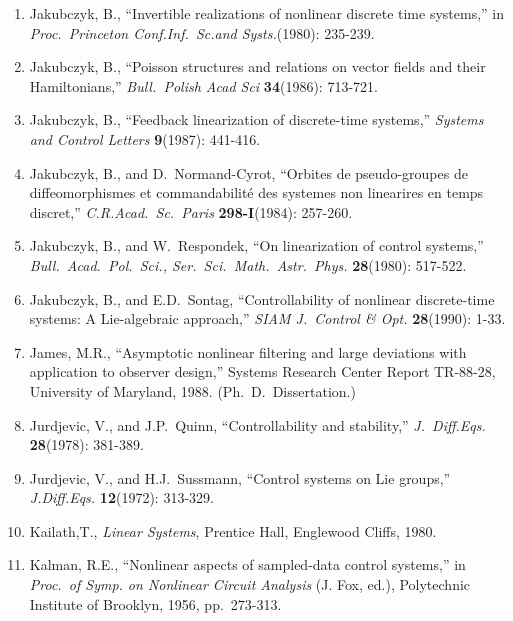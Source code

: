 \begin{enumerate}
\item
Jakubczyk, B., ``Invertible realizations of nonlinear discrete time systems,''
in {\it Proc.\ Princeton Conf.Inf.\ Sc.and Systs.}(1980): 235-239.

\item
Jakubczyk, B., ``Poisson structures and relations on vector fields and their
Hamiltonians,'' {\it Bull.\ Polish Acad Sci} {\bf 34}(1986): 713-721.

\item
Jakubczyk, B., ``Feedback linearization of discrete-time systems,'' {\it
Systems and Control Letters} {\bf 9}(1987): 441-416.

\item
Jakubczyk, B., and D.\ Normand-Cyrot, ``Orbites de pseudo-groupes de
diffeomorphismes et commandabilit\'e des systemes non linearires en temps
discret,'' {\it C.R.Acad.\ Sc.\ Paris} {\bf 298-I}(1984): 257-260.

\item
Jakubczyk, B., and W.\ Respondek, ``On linearization of control systems,''
{\it Bull.\ Acad.~Pol.~Sci., Ser.\ Sci.\ Math.\ Astr.\ Phys.} {\bf 28}(1980):
517-522.

\item
Jakubczyk, B., and E.D.\ Sontag, ``Controllability of nonlinear
dis\-crete-time systems: A Lie-algebraic approach,'' {\it SIAM J.\ Control \&
Opt.} {\bf 28}(1990): 1-33.

\item
James, M.R., ``Asymptotic nonlinear filtering and large deviations with
application to observer design,'' Systems Research Center Report TR-88-28,
University of Maryland, 1988.  (Ph.\ D.\ Dissertation.)

\item
Jurdjevic, V., and J.P.\ Quinn, ``Controllability and stability,'' {\it J.\
Diff.Eqs.} {\bf 28}(1978): 381-389.

\item
Jurdjevic, V., and H.J.\ Sussmann, ``Control systems on Lie groups,'' {\it
J.Diff.Eqs.} {\bf 12}(1972): 313-329.

\item
Kailath,T., {\it Linear Systems}, Prentice Hall, Englewood Cliffs, 1980.

\item
Kalman, R.E., ``Nonlinear aspects of sampled-data control systems,'' in {\it
Proc.\ of Symp. on Nonlinear Circuit Analysis} (J. Fox, ed.), Polytechnic
Institute of Brooklyn, 1956, pp.\ 273-313.


\end{enumerate}
